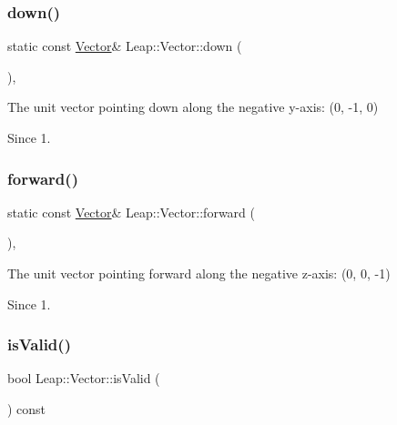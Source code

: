 \subsubsection{\texorpdfstring{down()}{down()}}
{\footnotesize\ttfamily static const \hyperlink{struct_leap_1_1_vector}{Vector}\& Leap\+::\+Vector\+::down (\begin{DoxyParamCaption}{ }\end{DoxyParamCaption})\hspace{0.3cm}{\ttfamily [inline]}, {\ttfamily [static]}}

The unit vector pointing down along the negative y-\/axis\+: (0, -\/1, 0)


\begin{DoxyCodeInclude}
\end{DoxyCodeInclude}
 \begin{DoxySince}{Since}
1. 
\end{DoxySince}
\mbox{\label{struct_leap_1_1_vector_a79b32a38e4c99b6ddbf94ac22680d405}} 
\subsubsection{\texorpdfstring{forward()}{forward()}}
{\footnotesize\ttfamily static const \hyperlink{struct_leap_1_1_vector}{Vector}\& Leap\+::\+Vector\+::forward (\begin{DoxyParamCaption}{ }\end{DoxyParamCaption})\hspace{0.3cm}{\ttfamily [inline]}, {\ttfamily [static]}}

The unit vector pointing forward along the negative z-\/axis\+: (0, 0, -\/1)


\begin{DoxyCodeInclude}
\end{DoxyCodeInclude}
 \begin{DoxySince}{Since}
1. 
\end{DoxySince}
\mbox{\label{struct_leap_1_1_vector_a8de2566e35891a7a3856effb7d7df919}} 
\subsubsection{\texorpdfstring{is\+Valid()}{isValid()}}
{\footnotesize\ttfamily bool Leap\+::\+Vector\+::is\+Valid (\begin{DoxyParamCaption}{ }\end{DoxyParamCaption}) const\hspace{0.3cm}{\ttfamily [inline]}}

